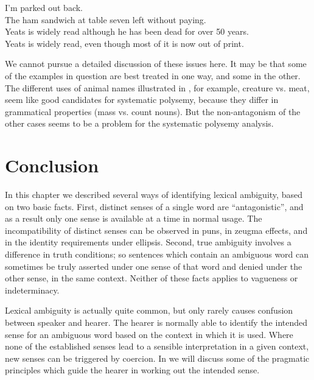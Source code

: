 \ea \label{ex:5.24}
\ea I’m parked out back.\\
\ex The ham sandwich at table seven left without paying.\\
\ex Yeats is widely read although he has been dead for over 50 years.\\
\ex Yeats is widely read, even though most of it is now out of print.
                       \z
\z

\ea \label{ex:5.25}
                       \z
\z


We cannot pursue a detailed discussion of these issues here. It may be that some of the examples in question are best treated in one way, and some in the other. The different uses of animal names illustrated in , for example, creature vs. meat, seem like good candidates for systematic polysemy, because they differ in grammatical properties (mass vs. count nouns). But the non-antagonism of the other cases seems to be a problem for the systematic polysemy analysis.


\section{Conclusion}\label{sec:5.6}

In this chapter we described several ways of identifying lexical ambiguity, based on two basic facts. First, distinct senses of a single word are “antagonistic”, and as a result only one sense is available at a time in normal usage. The incompatibility of distinct senses can be observed in puns, in zeugma effects, and in the identity requirements under ellipsis. Second, true ambiguity involves a difference in truth conditions; so sentences which contain an ambiguous word can sometimes be truly asserted under one sense of that word and denied under the other sense, in the same context. Neither of these facts applies to vagueness or indeterminacy.



Lexical ambiguity is actually quite common, but only rarely causes confusion between speaker and hearer. The hearer is normally able to identify the intended sense for an ambiguous word based on the context in which it is used. Where none of the established senses lead to a sensible interpretation in a given context, new senses can be triggered by coercion. In  we will discuss some of the pragmatic principles which guide the hearer in working out the intended sense.



